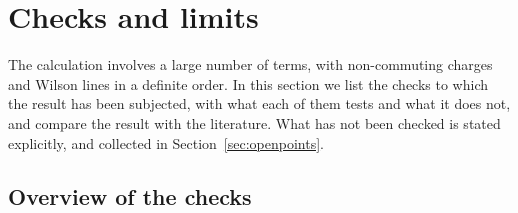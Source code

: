 \section{Checks and limits}\label{sec:checks}

The calculation involves a large number of terms, with non-commuting charges and Wilson lines in a definite order. In this section we list the checks to which the result has been subjected, with what each of them tests and what it does not, and compare the result with the literature. What has not been checked is stated explicitly, and collected in Section~\ref{sec:openpoints}.

\subsection{Overview of the checks}\label{sec:checks_table}

